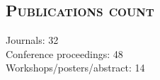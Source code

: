\documentclass[margin,10pt]{res} %
\begin{document}
\begin{resume}

\section{\textnormal{\textsc{Publications count}}}
Journals: 32\\
Conference proceedings: 48\\
Workshops/posters/abstract: 14\\


\end{resume}
\end{document}
